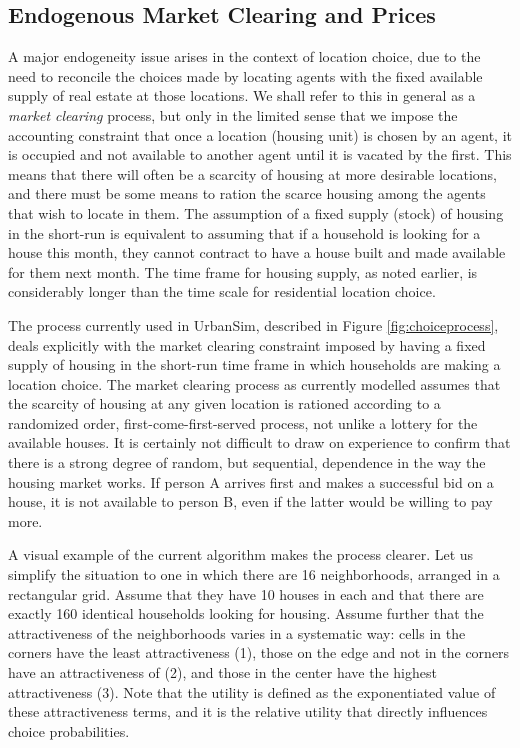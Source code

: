 \documentclass[12pt,a4paper]{article}
\begin{document}
\subsection{Endogenous Market Clearing and Prices}

A major endogeneity issue arises in the context of location
choice, due to the need to reconcile the choices made by locating
agents with the fixed available supply of real estate at those
locations. We shall refer to this in general as a \emph{market
clearing} process, but only in the limited sense that we impose
the accounting constraint that once a location (housing unit) is
chosen by an agent, it is occupied and not available to another
agent until it is vacated by the first.  This means that there
will often be a scarcity of housing at more desirable locations,
and there must be some means to ration the scarce housing among
the agents that wish to locate in them. The assumption of a fixed
supply (stock) of housing in the short-run is equivalent to
assuming that if a household is looking for a house this month,
they cannot contract to have a house built and made available for
them next month.  The time frame for housing supply, as noted
earlier, is considerably longer than the time scale for
residential location choice.

The process currently used in UrbanSim, described in Figure
\ref{fig:choiceprocess}, deals explicitly with the market clearing
constraint imposed by having a fixed supply of housing in the
short-run time frame in which households are making a location
choice.  The market clearing process as currently modelled assumes
that the scarcity of housing at any given location is rationed
according to a randomized order, first-come-first-served process,
not unlike a lottery for the available houses.  It is certainly
not difficult to draw on experience to confirm that there is a
strong degree of random, but sequential, dependence in the way the
housing market works. If person A arrives first and makes a
successful bid on a house, it is not available to person B, even
if the latter would be willing to pay more.

A visual example of the current algorithm makes the process
clearer. Let us simplify the situation to one in which there are
16 neighborhoods, arranged in a rectangular grid.  Assume that
they have 10 houses in each and that there are exactly 160
identical households looking for housing.  Assume further that the
attractiveness of the neighborhoods varies in a systematic way:
cells in the corners have the least attractiveness (1), those on
the edge and not in the corners have an attractiveness of (2), and
those in the center have the highest attractiveness (3).  Note
that the utility is defined as the exponentiated value of these
attractiveness terms, and it is the relative utility that directly
influences choice probabilities.
\end{document}
